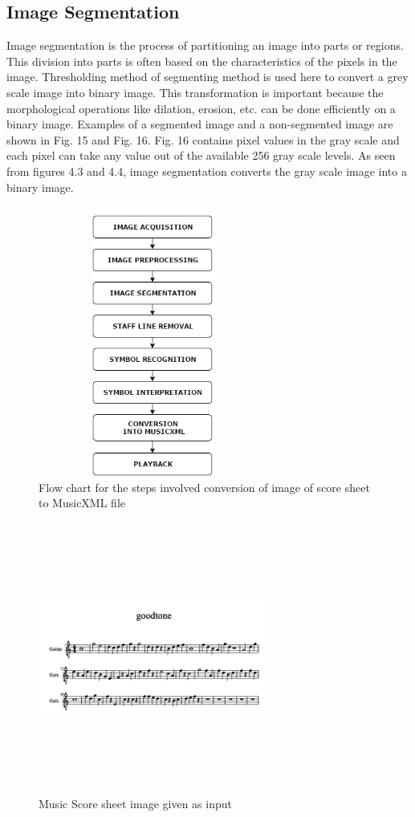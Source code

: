 \documentclass[journal]{IEEEtran}
\begin{document}
\subsection{Image Segmentation}
Image segmentation is the process of partitioning an image into parts or regions. This division into parts is often based on the characteristics of the pixels in the image. Thresholding method of segmenting method is used here to convert a grey scale image into binary image. This transformation is important because the morphological operations like dilation, erosion, etc. can be done efficiently on a binary image. Examples of a segmented image and a non-segmented image are shown in Fig. 15 and Fig. 16. Fig. 16 contains pixel values in the gray scale and each pixel can take any value out of the available 256 gray scale levels. As seen from figures 4.3 and 4.4, image segmentation converts the gray scale image into a binary image. 

\begin{figure}
\includegraphics[width=3in,height=3.5in,clip,keepaspectratio]{resources/flowchart/flowchart}
\centering
\caption{Flow chart for the steps involved conversion of image of score sheet to MusicXML file}
\end{figure}

\begin{figure}
\includegraphics[width=3in,height=3.5in,clip,keepaspectratio]{resources/implementation/good_tone}
\centering
\caption{Music Score sheet image given as input}
\end{figure}
\end{document}
